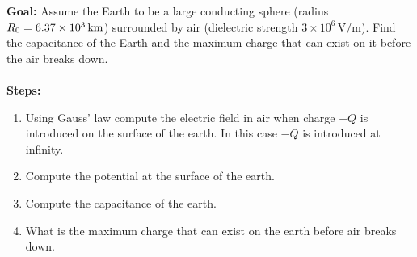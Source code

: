 \documentclass[../../header.tex]{subfiles}
\begin{document}
\textbf{Goal:} Assume the Earth to be a large conducting sphere (radius $R_0 = 6.37 \times 10^3\,\text{km}$) surrounded by air (dielectric strength $3 \times 10^6\,\text{V/m}$). Find the capacitance of the Earth and the maximum charge that can exist on it before the air breaks down.\\
\\
\textbf{Steps:} 
\begin{enumerate}
\item Using Gauss' law compute the electric field in air when charge $+Q$ is introduced on the surface of the earth. In this case $-Q$ is introduced at infinity.


\item Compute the potential at the surface of the earth.


\item Compute the capacitance of the earth.


\item What is the maximum charge that can exist on the earth before air breaks down.

\end{enumerate}
\end{document}
